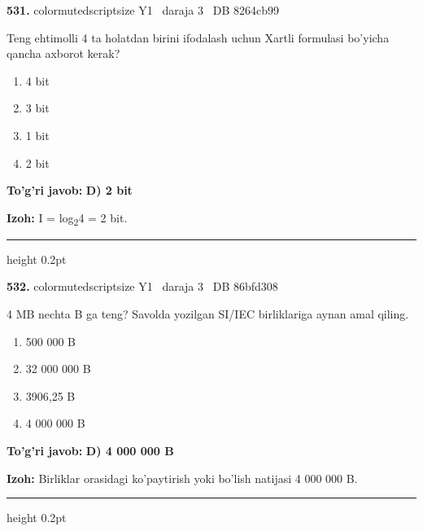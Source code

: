 \documentclass[10pt,a4paper,oneside]{article}
\begin{document}
\noindent\textbf{\color{ink}531.}  {color{muted}scriptsize Y1 \textbullet\ daraja 3 \textbullet\ DB 8264cb99}
\par
Teng ehtimolli 4 ta holatdan birini ifodalash uchun Xartli formulasi bo'yicha qancha axborot kerak?
\begin{enumerate}[label=\Alph*),leftmargin=9mm]
\item 4 bit
\item 3 bit
\item 1 bit
\item 2 bit
\end{enumerate}
\begin{tcolorbox}[enhanced,breakable,colback=teal!4,colframe=teal!50!black,boxrule=0.5pt,arc=1.1mm,left=3mm,right=3mm,top=1.7mm,bottom=1.7mm,before skip=2mm,after skip=2mm]
\textbf{\color{teal}To'g'ri javob:} \textbf{D) 2 bit}
\par\smallskip
\textbf{Izoh:} I = log\textsubscript{2}4 = 2 bit.
\end{tcolorbox}
\vspace{2mm}\hrule height 0.2pt \vspace{3mm}

\noindent\textbf{\color{ink}532.}  {color{muted}scriptsize Y1 \textbullet\ daraja 3 \textbullet\ DB 86bfd308}
\par
4 MB nechta B ga teng? Savolda yozilgan SI/IEC birliklariga aynan amal qiling.
\begin{enumerate}[label=\Alph*),leftmargin=9mm]
\item 500 000 B
\item 32 000 000 B
\item 3906,25 B
\item 4 000 000 B
\end{enumerate}
\begin{tcolorbox}[enhanced,breakable,colback=teal!4,colframe=teal!50!black,boxrule=0.5pt,arc=1.1mm,left=3mm,right=3mm,top=1.7mm,bottom=1.7mm,before skip=2mm,after skip=2mm]
\textbf{\color{teal}To'g'ri javob:} \textbf{D) 4 000 000 B}
\par\smallskip
\textbf{Izoh:} Birliklar orasidagi ko'paytirish yoki bo'lish natijasi 4 000 000 B.
\end{tcolorbox}
\vspace{2mm}\hrule height 0.2pt \vspace{3mm}
\end{document}
